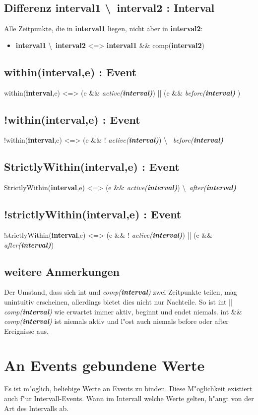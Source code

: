\documentclass[article,colorback,accentcolor=tud4c]{tudreport}
\newcommand{\before}[1]{\textit{ before(#1) }}
\newcommand{\after}[1]{\textit{after(#1)}}
\newcommand{\aktiv}[1]{\textit{active(#1)}}
\newcommand{\Interval}[1]{\textbf{interval#1}}
\newcommand{\comp}[1]{\textit{comp(#1)}}
\begin{document}
\subsection{Differenz \Interval{1} \textbackslash\ \Interval{2} : Interval}
Alle Zeitpunkte, die in \Interval{1} liegen, nicht aber in \Interval{2}:
\begin{itemize}
  \item  \Interval{1} \textbackslash\ \Interval{2} <=> \Interval{1} \&\&
  comp(\Interval{2})
\end{itemize}


\subsection{within(\Interval{},e) : Event}
within(\Interval{},e) <=> (e \&\& \aktiv{\Interval}) || (e \&\& \before{\Interval})

\subsection{!within(\Interval{},e) : Event}
!within(\Interval{},e) <=> (e \&\& ! \aktiv{\Interval}) \textbackslash\ \before{\Interval}

\subsection{ StrictlyWithin(\Interval{},e) : Event}
StrictlyWithin(\Interval{},e) <=> (e \&\& \aktiv{\Interval}) \textbackslash\ \after{\Interval}

\subsection{ !strictlyWithin(\Interval{},e) : Event }
!strictlyWithin(\Interval{},e) <=> (e \&\& ! \aktiv{\Interval}) || (e \&\& \after{\Interval})


\subsection{weitere Anmerkungen}
Der Umstand, dass sich int und \comp{\Interval{}} zwei Zeitpunkte teilen, mag
unintuitiv erscheinen, allerdings  bietet dies nicht nur Nachteile. So ist int
|| \comp{\Interval{}} wie  erwartet immer aktiv, beginnt und endet niemals. int
\&\& \comp{\Interval{}} ist niemals aktiv  und l"ost auch niemals before oder
after Ereignisse aus.

  \section{An Events gebundene Werte}
Es ist m"oglich, beliebige Werte an Events zu binden. Diese M"oglichkeit
existiert auch f"ur Intervall-Events. Wann im Intervall welche Werte
gelten, h"angt von der Art des Intervalls ab. 
\end{document}

